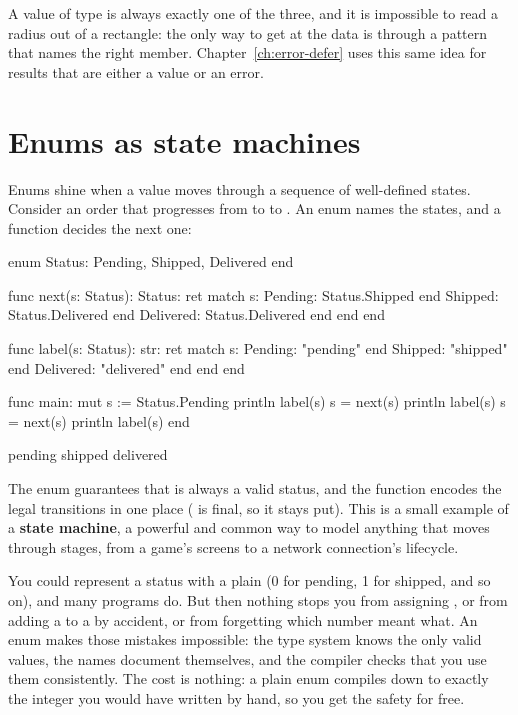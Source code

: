 A value of type  is always exactly one of the three, and it is
impossible to read a radius out of a rectangle: the only way to get at the data
is through a pattern that names the right member. Chapter~\ref{ch:error-defer}
uses this same idea for results that are either a value or an error.

\section{Enums as state machines}

Enums shine when a value moves through a sequence of well-defined states. Consider
an order that progresses from  to  to
. An enum names the states, and a function decides the next one:

\begin{salamen}
enum Status: Pending, Shipped, Delivered end

func next(s: Status): Status:
    ret match s:
        Pending: Status.Shipped end
        Shipped: Status.Delivered end
        Delivered: Status.Delivered end
    end
end

func label(s: Status): str:
    ret match s:
        Pending: "pending" end
        Shipped: "shipped" end
        Delivered: "delivered" end
    end
end

func main:
    mut s := Status.Pending
    println label(s)
    s = next(s)
    println label(s)
    s = next(s)
    println label(s)
end
\end{salamen}

\begin{progout}
pending
shipped
delivered
\end{progout}

The enum guarantees that  is always a valid status, and the 
function encodes the legal transitions in one place ( is final,
so it stays put). This is a small example of a \textbf{state machine}, a powerful
and common way to model anything that moves through stages, from a game's
screens to a network connection's lifecycle.

\begin{deep}
You could represent a status with a plain  (0 for pending, 1 for
shipped, and so on), and many programs do. But then nothing stops you from
assigning , or from adding a  to a  by accident,
or from forgetting which number meant what. An enum makes those mistakes
impossible: the type system knows the only valid values, the names document
themselves, and the compiler checks that you use them consistently. The cost is
nothing: a plain enum compiles down to exactly the integer you would have written by
hand, so you get the safety for free.
\end{deep}

